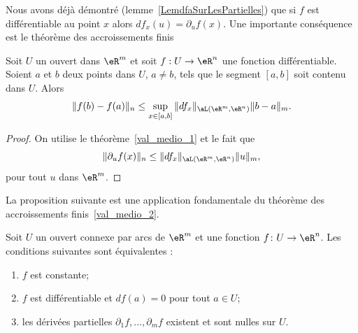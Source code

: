 Nous avons déjà démontré (lemme~\ref{LemdfaSurLesPartielles}) que si \( f\) est différentiable au point \( x\) alors  \( df_x(u)=\partial_uf(x)\). Une importante conséquence est le théorème des accroissements finis
\begin{theorem}\label{val_medio_2}
	Soit \( U\) un ouvert dans \( \eR^m\) et soit \( f:U\to\eR^n\) une fonction différentiable. Soient \( a\) et \( b\) deux points dans \( U\), \( a\neq b\), tels que le segment \( [a,b]\) soit contenu dans \( U\). Alors
	\begin{equation}
		\|f(b)-f(a)\|_n\leq \sup_{x\in[a,b]}\|df_x\|_{\aL(\eR^m,\eR^n)}\|b-a\|_m.
	\end{equation}
\end{theorem}

\begin{proof}
	On utilise le théorème~\ref{val_medio_1} et le fait que
	\[
		\|\partial_u f(x)\|_n\leq \|df_x\|_{\aL(\eR^m,\eR^n)}\|u\|_m,
	\]
	pour tout \( u\) dans \( \eR^m\).
\end{proof}

La proposition suivante est une application fondamentale du théorème des accroissements finis~\ref{val_medio_2}.
\begin{proposition}		\label{PropAnnulationEtConstance}
	Soit \( U\) un ouvert connexe par arcs de \( \eR^m\) et une fonction \( f\colon U\to \eR^n\). Les conditions suivantes sont équivalentes :
	\begin{enumerate}
		\item\label{ItemPropCstDiffZeroi}
		      \( f\) est constante;
		\item\label{ItemPropCstDiffZeroii}
		      \( f\) est différentiable et \( df(a)=0\) pour tout \( a\in U\);
		\item\label{ItemPropCstDiffZeroiii}
		      les dérivées partielles \( \partial_1f,\ldots,\partial_mf\) existent et sont nulles sur \( U\).
	\end{enumerate}
\end{proposition}

